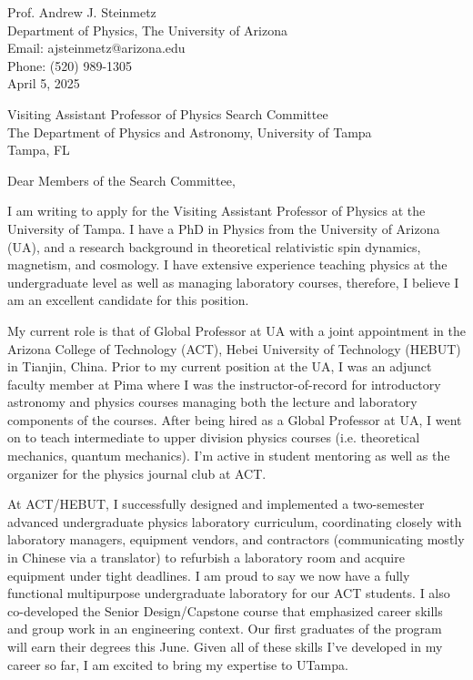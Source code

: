 \documentclass[11pt]{article}
\begin{document}
Prof. Andrew J. Steinmetz\\
Department of Physics, The University of Arizona\\
Email: ajsteinmetz@arizona.edu\\
Phone: (520) 989-1305\\

April 5, 2025

\vspace{1em}

\noindent
Visiting Assistant Professor of Physics Search Committee\\
The Department of Physics and Astronomy, University of Tampa\\
Tampa, FL

\vspace{1em}

\noindent
Dear Members of the Search Committee,

\vspace{1em}

I am writing to apply for the Visiting Assistant Professor of Physics at the University of Tampa. I have a PhD in Physics from the University of Arizona (UA), and a research background in theoretical relativistic spin dynamics, magnetism, and cosmology. I have extensive experience teaching physics at the undergraduate level as well as managing laboratory courses, therefore, I believe I am an excellent candidate for this position.

My current role is that of Global Professor at UA with a joint appointment in the Arizona College of Technology (ACT), Hebei University of Technology (HEBUT) in Tianjin, China. Prior to my current position at the UA, I was an adjunct faculty member at Pima where I was the instructor-of-record for introductory astronomy and physics courses managing both the lecture and laboratory components of the courses. After being hired as a Global Professor at UA, I went on to teach intermediate to upper division physics courses (i.e. theoretical mechanics, quantum mechanics). I'm active in student mentoring as well as the organizer for the physics journal club at ACT.

At ACT/HEBUT, I successfully designed and implemented a two-semester advanced undergraduate physics laboratory curriculum, coordinating closely with laboratory managers, equipment vendors, and contractors (communicating mostly in Chinese via a translator) to refurbish a laboratory room and acquire equipment under tight deadlines. I am proud to say we now have a fully functional multipurpose undergraduate laboratory for our ACT students. I also co-developed the Senior Design/Capstone course that emphasized career skills and group work in an engineering context. Our first graduates of the program will earn their degrees this June. Given all of these skills I've developed in my career so far, I am excited to bring my expertise to UTampa.
\end{document}
